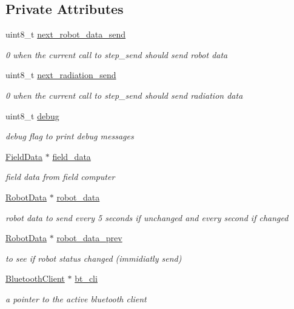 \subsection*{Private Attributes}
\begin{DoxyCompactItemize}
\item 
uint8\+\_\+t \hyperlink{class_messenger_af47b5f9743fcef4fdb73801ae7c6b023}{next\+\_\+robot\+\_\+data\+\_\+send}
\begin{DoxyCompactList}\small\item\em 0 when the current call to step\+\_\+send should send robot data \end{DoxyCompactList}\item 
uint8\+\_\+t \hyperlink{class_messenger_a4da89e69daa6684d63fa02ff64886fe6}{next\+\_\+radiation\+\_\+send}
\begin{DoxyCompactList}\small\item\em 0 when the current call to step\+\_\+send should send radiation data \end{DoxyCompactList}\item 
uint8\+\_\+t \hyperlink{class_messenger_a103d1964b9540a6b6b1c4ea7d79f3af3}{debug}
\begin{DoxyCompactList}\small\item\em debug flag to print debug messages \end{DoxyCompactList}\item 
\hyperlink{class_field_data}{Field\+Data} $\ast$ \hyperlink{class_messenger_a8e4a16dc0dcfa44af9030a9ad8f69fa2}{field\+\_\+data}
\begin{DoxyCompactList}\small\item\em field data from field computer \end{DoxyCompactList}\item 
\hyperlink{class_robot_data}{Robot\+Data} $\ast$ \hyperlink{class_messenger_aaeacb9e9c4aad3b1be628df9ec71c11c}{robot\+\_\+data}
\begin{DoxyCompactList}\small\item\em robot data to send every 5 seconds if unchanged and every second if changed \end{DoxyCompactList}\item 
\hyperlink{class_robot_data}{Robot\+Data} $\ast$ \hyperlink{class_messenger_a65277b6683e6c95e15fcf0eddad6df45}{robot\+\_\+data\+\_\+prev}
\begin{DoxyCompactList}\small\item\em to see if robot status changed (immidiatly send) \end{DoxyCompactList}\item 
\hyperlink{class_bluetooth_client}{Bluetooth\+Client} $\ast$ \hyperlink{class_messenger_a481ed6f0554ddfb8441b7dc073f57ebd}{bt\+\_\+cli}
\begin{DoxyCompactList}\small\item\em a pointer to the active bluetooth client \end{DoxyCompactList}\end{DoxyCompactItemize}


